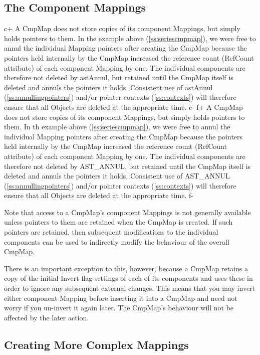 \documentclass[twoside,11pt]{article}
\newcommand{\secref}[1]{\S\ref{#1}}
\renewcommand{\secref}[1]{\ref{#1}}
\begin{document}
\subsection{\label{ss:cmpmapcomponents}The Component Mappings}

c+
A CmpMap does not store copies of its component Mappings, but simply
holds pointers to them. In the example above
(\secref{ss:seriescmpmap}), we were free to annul the individual
Mapping pointers after creating the CmpMap because the pointers held
internally by the CmpMap increased the reference count (RefCount
attribute) of each component Mapping by one. The individual components
are therefore not deleted by astAnnul, but retained until the CmpMap
itself is deleted and annuls the pointers it holds. Consistent use of
astAnnul (\secref{ss:annullingpointers}) and/or pointer contexts
(\secref{ss:contexts}) will therefore ensure that all Objects are
deleted at the appropriate time.
c-
f+
A CmpMap does not store copies of its component Mappings, but simply
holds pointers to them. In th example above (\secref{ss:seriescmpmap}),
we were free to annul the individual Mapping pointers after creating
the CmpMap because the pointers held internally by the CmpMap
increased the reference count (RefCount attribute) of each component
Mapping by one. The individual components are therefore not deleted by
AST\_ANNUL, but retained until the CmpMap itself is deleted and annuls
the pointers it holds. Consistent use of AST\_ANNUL
(\secref{ss:annullingpointers}) and/or pointer contexts
(\secref{ss:contexts}) will therefore ensure that all Objects are
deleted at the appropriate time.
f-

Note that access to a CmpMap's component Mappings is not generally
available unless pointers to them are retained when the CmpMap is
created. If such pointers are retained, then subsequent modifications
to the individual components can be used to indirectly modify the
behaviour of the overall CmpMap.

There is an important exception to this, however, because a CmpMap
retains a copy of the initial Invert flag settings of each of its
components and uses these in order to ignore any subsequent external
changes. This means that you may invert either component Mapping
before inserting it into a CmpMap and need not worry if you un-invert
it again later. The CmpMap's behaviour will not be affected by the
later action.

\subsection{\label{ss:complexcmpmap}Creating More Complex Mappings}
\end{document}
